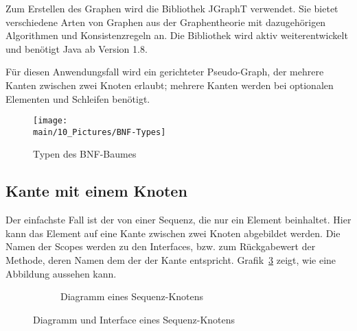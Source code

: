 \documentclass[../InterneDSLs.tex]{subfiles}
\begin{document}
Zum Erstellen des Graphen wird die Bibliothek JGraphT\cite{JGraphT} verwendet. Sie bietet verschiedene Arten von Graphen aus der Graphentheorie mit dazugehörigen Algorithmen und Konsistenzregeln an. Die Bibliothek wird aktiv weiterentwickelt und benötigt Java ab Version 1.8.

Für diesen Anwendungsfall wird ein gerichteter Pseudo-Graph, der mehrere Kanten zwischen zwei Knoten erlaubt; mehrere Kanten werden bei optionalen Elementen und Schleifen benötigt.


\begin{figure}[ht]
\centering
\texttt{[image: \\main/10\_Pictures/BNF-Types]}
\caption{Typen des BNF-Baumes}
\label{FIG:TypesBNF}
\end{figure}

\subsection{Kante mit einem Knoten}
Der einfachste Fall ist der von einer Sequenz, die nur ein Element beinhaltet. Hier kann das Element auf eine Kante zwischen zwei Knoten abgebildet werden. Die Namen der Scopes werden zu den Interfaces, bzw. zum Rückgabewert der Methode, deren Namen dem der der Kante entspricht. Grafik~\ref{FIG:OneElementNode} zeigt, wie eine Abbildung aussehen kann.
\begin{figure}[ht]
\centering
  \begin{subfigure}[c]{0.49\textwidth}
    \caption{Diagramm eines Sequenz-Knotens}
    \label{FIG:DiagramOneElementNode}
  \end{subfigure}
  \begin{subfigure}[c]{0.49\textwidth}
    
  \end{subfigure}
  \caption{Diagramm und Interface eines Sequenz-Knotens}
  \label{FIG:OneElementNode}
\end{figure}
\end{document}
